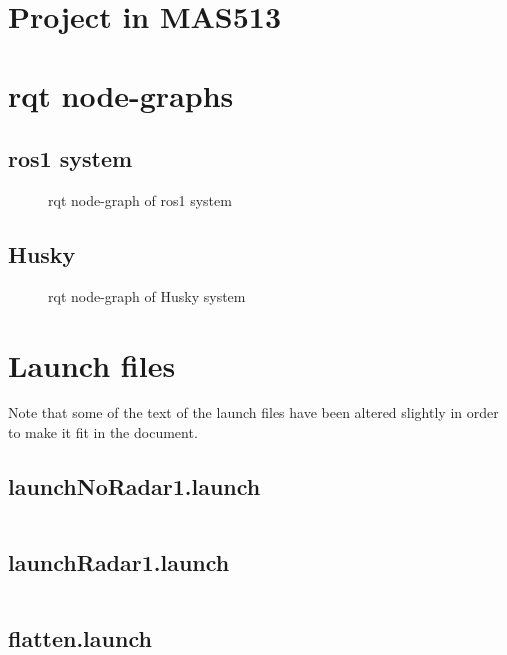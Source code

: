 \appendix

\chapter{Project in MAS513}
\label{Appdix:MAS513}
 

\chapter{rqt node-graphs}
\section{ros1 system}
\label{Appdix:rqtROS1NB}
\newpage
\begin{figure}[H]

  \caption{rqt node-graph of ros1 system}
  \label{fig:Appdix:rqt:ros1_noBridge}
\end{figure}

\section{Husky}
\label{Appdix:rqtHusky}
\newpage
\begin{figure}[H]
\centering

  \caption{rqt node-graph of Husky system}
  \label{fig:Appdix:rqt:ros2_husky}
\end{figure}

\chapter{Launch files}
Note that some of the text of the launch files have been altered slightly in order to make it fit in the document.
\section{launchNoRadar1.launch}
\label{Appdix:launchNoRadar1.launch}
\inputminted{xml}{ros_system/launch/launchNoRadar1.launch}

\section{launchRadar1.launch}
\label{Appdix:launchRadar1.launch}
\inputminted{xml}{ros_system/launch/launchRadar1.launch}
\section{flatten.launch}
\label{Appdix:flatten.launch}
\inputminted{xml}{ros_system/launch/src/sublaunch/flatten.launch}

